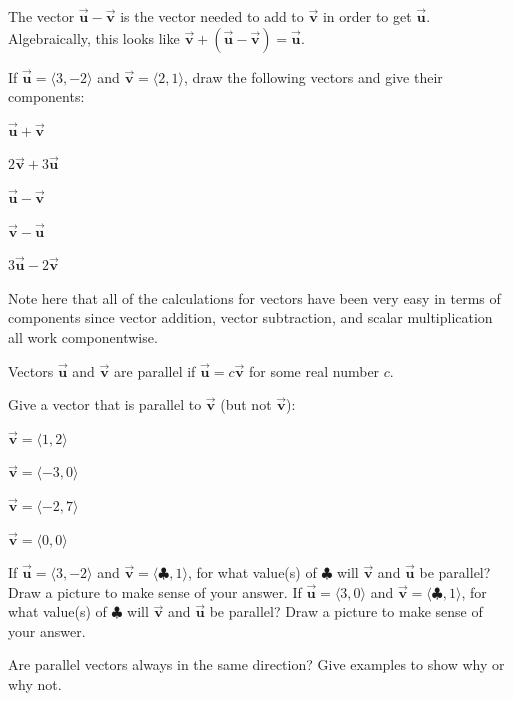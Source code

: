 \begin{info} The vector $\vec{\textbf{u}}- \vec{\textbf{v}}$ is the vector needed to add to $\vec{\textbf{v}}$ in order to get $\vec{\textbf{u}}$. Algebraically, this looks like $\vec{\textbf{v}} +(\vec{\textbf{u}}- \vec{\textbf{v}})=\vec{\textbf{u}}$.
\end{info}

\bq If $\vec{\textbf{u}}=\langle 3,-2\rangle$ and $\vec{\textbf{v}}=\langle 2,1\rangle$, draw the following vectors and give their components:
\be
\item $\vec{\textbf{u}}+ \vec{\textbf{v}}$
\item $2\vec{\textbf{v}}+3 \vec{\textbf{u}}$
\item $\vec{\textbf{u}}- \vec{\textbf{v}}$
\item $\vec{\textbf{v}}- \vec{\textbf{u}}$
\item $3\vec{\textbf{u}}-2 \vec{\textbf{v}}$
\ee
\eq

\begin{info} Note here that all of the calculations for vectors have been very easy in terms of components since vector addition, vector subtraction, and scalar multiplication all work componentwise.

Vectors $\vec{\textbf{u}}$ and $\vec{\textbf{v}}$ are parallel if $\vec{\textbf{u}}= c \vec{\textbf{v}}$ for some real number $c$. \end{info}

\bq Give a vector that is parallel to $\vec{\textbf{v}}$ (but not $\vec{\textbf{v}}$):
\be
\item $\vec{\textbf{v}}= \langle 1,2 \rangle$
\item $\vec{\textbf{v}}= \langle -3,0 \rangle$
\item $\vec{\textbf{v}}= \langle -2,7 \rangle$
\item $\vec{\textbf{v}}= \langle 0,0 \rangle$
\ee
\eq

\bq If $\vec{\textbf{u}}=\langle 3,-2\rangle$ and $\vec{\textbf{v}}=\langle \clubsuit,1\rangle$, for what value(s) of $\clubsuit$ will $\vec{\textbf{v}}$ and $\vec{\textbf{u}}$ be parallel? Draw a picture to make sense of your answer.
\eq
\bq If $\vec{\textbf{u}}=\langle 3,0\rangle$ and $\vec{\textbf{v}}=\langle \clubsuit,1\rangle$, for what value(s) of $\clubsuit$ will $\vec{\textbf{v}}$ and $\vec{\textbf{u}}$ be parallel? Draw a picture to make sense of your answer.
\eq

\bq Are parallel vectors always in the same direction? Give examples to show why or why not. \eq

